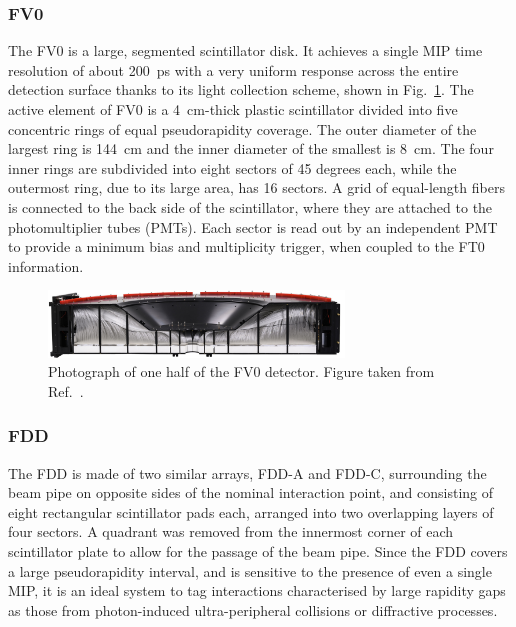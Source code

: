 \subsubsection{FV0}
The FV0 is a large, segmented scintillator disk. It achieves a single MIP time resolution of about 200~ps with a very uniform response across the entire detection surface thanks to its light collection scheme, shown in Fig.~\ref{fig:FV0}. The active element of FV0 is a 4~cm-thick plastic scintillator divided into five concentric rings of equal pseudorapidity coverage. The outer diameter of the largest ring is 144~cm and the inner diameter of the smallest is 8~cm. The four inner rings are subdivided into eight sectors of 45 degrees each, while the outermost ring, due to its large area, has 16 sectors. A grid of equal-length fibers is connected to the back side of the scintillator, where they are attached to the photomultiplier tubes (PMTs). Each sector is read out by an independent PMT to provide a minimum bias and multiplicity trigger, when coupled to the FT0 information.

\begin{figure}[htb]
    \centering
    \includegraphics[width=0.7\textwidth]{Figures/Chapter 3/FV0_Scheme.jpg}
    \caption{Photograph of one half of the FV0 detector. Figure taken from Ref.~\cite{ALICE:2023udb}.}
    \label{fig:FV0}
\end{figure}

\subsubsection{FDD}
The FDD is made of two similar arrays, FDD-A and FDD-C, surrounding the beam pipe on opposite sides of the nominal interaction point, and consisting of eight rectangular scintillator pads each, arranged into two overlapping layers of four sectors. A quadrant was removed from the innermost corner of each scintillator plate to allow for the passage of the beam pipe. Since the FDD covers a large pseudorapidity interval, and is sensitive to the presence of even a single MIP, it is an ideal system to tag interactions characterised by large rapidity gaps as those from photon-induced ultra-peripheral collisions or diffractive processes.